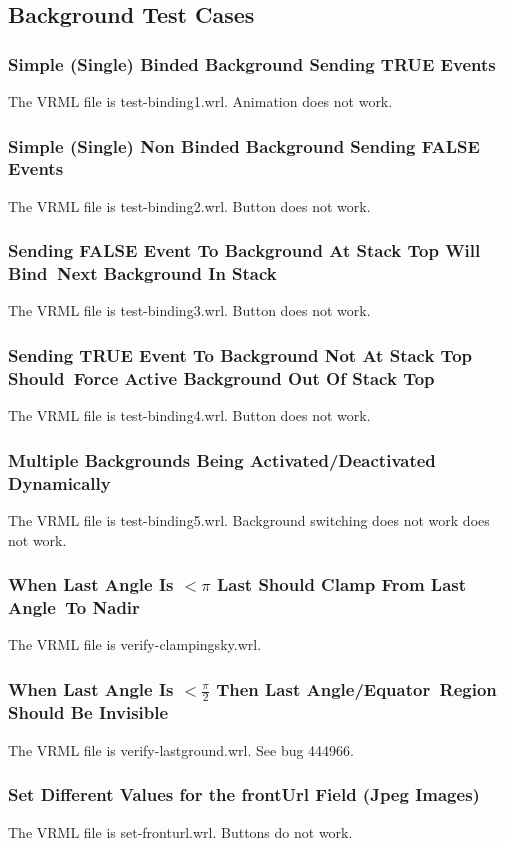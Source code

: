 \documentclass[12pt,letterpaper]{article}
\newcommand{\BkgA}{Simple (Single) Binded Background Sending TRUE Events}
\newcommand{\BkgB}{Simple (Single) Non Binded Background Sending FALSE Events}
\newcommand{\BkgCa}{Sending FALSE Event To Background At Stack Top Will Bind~}
\newcommand{\BkgCb}{Next Background In Stack}
\newcommand{\BkgDa}{Sending TRUE Event To Background Not At Stack Top Should~}
\newcommand{\BkgDb}{Force Active Background Out Of Stack Top}
\newcommand{\BkgE}{Multiple Backgrounds Being Activated/Deactivated Dynamically}
\newcommand{\BkgFa}{When Last Angle Is $ < \pi$ Last Should Clamp From Last Angle~}
\newcommand{\BkgFb}{To Nadir}
\newcommand{\BkgGa}{When Last Angle Is $ < \frac{\pi}{2}$ Then Last Angle/Equator~}
\newcommand{\BkgGb}{Region Should Be Invisible}
\newcommand{\BkgH}{Set Different Values for the frontUrl Field (Jpeg Images)}
\begin{document}
\subsection{Background Test Cases}

\setcounter{subsubsection}{0}

\subsubsection{\BkgA}
The VRML file is test-binding1.wrl.
Animation does not work.

\subsubsection{\BkgB}
The VRML file is test-binding2.wrl.
Button does not work.

\subsubsection{\BkgCa\BkgCb}
The VRML file is test-binding3.wrl.
Button does not work.

\subsubsection{\BkgDa\BkgDb}
The VRML file is test-binding4.wrl.
Button does not work.

\subsubsection{\BkgE}
The VRML file is test-binding5.wrl.
Background switching does not work does not work.

\subsubsection{\BkgFa\BkgFb}
The VRML file is verify-clampingsky.wrl.

\subsubsection{\BkgGa\BkgGb}
The VRML file is verify-lastground.wrl.
See bug 444966.

\subsubsection{\BkgH}
The VRML file is set-fronturl.wrl.
Buttons do not work.
\end{document}
